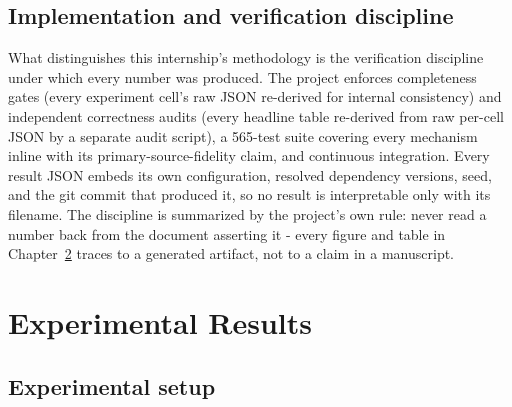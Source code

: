 \documentclass[11pt,a4paper]{report}
\begin{document}
\section{Implementation and verification discipline}
\label{sec:verification}

What distinguishes this internship's methodology is the verification
discipline under which every number was produced. The project enforces
completeness gates (every experiment cell's raw JSON re-derived for internal
consistency) and independent correctness audits (every headline table
re-derived from raw per-cell JSON by a separate audit script), a 565-test
suite covering every mechanism inline with its primary-source-fidelity
claim, and continuous integration. Every result JSON embeds its own
configuration, resolved dependency versions, seed, and the git commit that
produced it, so no result is interpretable only with its filename. The
discipline is summarized by the project's own rule: never read a number back
from the document asserting it - every figure and table in
Chapter~\ref{ch:results} traces to a generated artifact, not to a claim in a
manuscript.

\chapter{Experimental Results}
\label{ch:results}

\section{Experimental setup}
\label{sec:setup}
\end{document}
